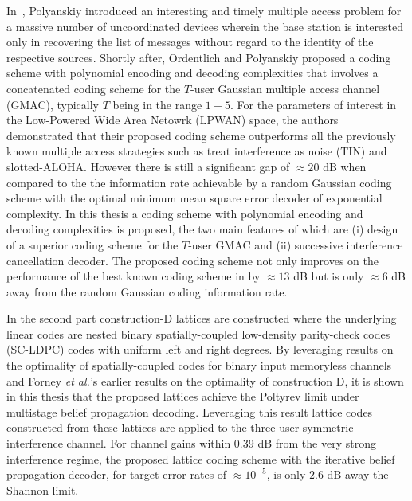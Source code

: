 	\indent In~\cite{polyanskiy2017perspective}, Polyanskiy introduced an interesting and timely multiple access problem for a massive number of uncoordinated devices wherein the base station is interested only in recovering the list of messages without regard to the identity of the respective sources. Shortly after, Ordentlich and Polyanskiy\cite{ordentlich2017low} proposed a coding scheme with polynomial encoding and decoding complexities that involves a concatenated coding scheme for the $T$-user Gaussian multiple access channel (GMAC), typically $T$ being in the range $1-5$. For the parameters of interest in the Low-Powered Wide Area Netowrk (LPWAN) space, the authors \cite{ordentlich2017low} demonstrated that their proposed coding scheme outperforms all the previously known multiple access strategies such as treat interference as noise (TIN) and slotted-ALOHA. However there is still a significant gap of $\approx 20$ dB when compared to the the information rate achievable by a random Gaussian coding scheme with the optimal minimum mean square error decoder of exponential complexity. In this thesis a coding scheme with polynomial encoding and decoding complexities is proposed, the two main features of which are (i) design of a superior coding scheme for the $T$-user GMAC and (ii) successive interference cancellation decoder. The proposed coding scheme not only improves on the performance of the best known coding scheme in \cite{ordentlich2017low} by $\approx 13$ dB but is only $\approx 6$ dB away from the random Gaussian coding information rate.

\indent In the second part construction-D lattices are constructed where the underlying linear codes are nested binary spatially-coupled low-density parity-check codes (SC-LDPC) codes with uniform left and right degrees. By leveraging results on the optimality of spatially-coupled codes for binary input memoryless channels and Forney {\em et al.}'s earlier results on the optimality of construction D, it is shown in this thesis that the proposed lattices achieve the Poltyrev limit under multistage belief propagation decoding. Leveraging this result lattice codes constructed from these lattices are applied to the three user symmetric interference channel. For channel gains within 0.39 dB from the very strong interference regime, the proposed lattice coding scheme with the iterative belief propagation decoder, for target error rates of $\approx 10^{-5}$, is only $2.6$ dB away the Shannon limit.

